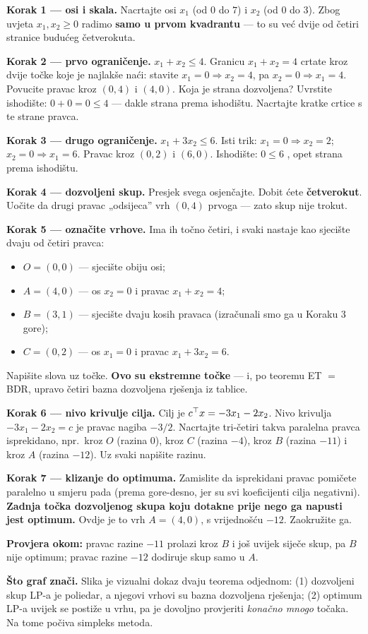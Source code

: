 \begin{crtanje}
\textbf{Korak 1 --- osi i skala.} Nacrtajte osi $x_1$ (od $0$ do $7$) i $x_2$
(od $0$ do $3$). Zbog uvjeta $x_1, x_2 \ge 0$ radimo \textbf{samo u prvom
kvadrantu} --- to su već dvije od četiri stranice budućeg četverokuta.

\textbf{Korak 2 --- prvo ograničenje.} $x_1 + x_2 \le 4$. Granicu $x_1+x_2=4$
crtate kroz dvije točke koje je najlakše naći: stavite $x_1=0 \Rightarrow
x_2=4$, pa $x_2=0 \Rightarrow x_1=4$. Povucite pravac kroz $(0,4)$ i $(4,0)$.
Koja je strana dozvoljena? Uvrstite ishodište: $0+0=0 \le 4$ \checkmark --- dakle
strana prema ishodištu. Nacrtajte kratke crtice s te strane pravca.

\textbf{Korak 3 --- drugo ograničenje.} $x_1 + 3x_2 \le 6$. Isti trik:
$x_1=0 \Rightarrow x_2=2$; $x_2=0 \Rightarrow x_1=6$. Pravac kroz $(0,2)$ i
$(6,0)$. Ishodište: $0 \le 6$ \checkmark, opet strana prema ishodištu.

\textbf{Korak 4 --- dozvoljeni skup.} Presjek svega osjenčajte. Dobit ćete
\textbf{četverokut}. Uočite da drugi pravac „odsijeca” vrh $(0,4)$ prvoga ---
zato skup nije trokut.

\textbf{Korak 5 --- označite vrhove.} Ima ih točno četiri, i svaki nastaje kao
sjecište dvaju od četiri pravca:
\begin{itemize}
  \item $O = (0,0)$ --- sjecište obiju osi;
  \item $A = (4,0)$ --- os $x_2 = 0$ i pravac $x_1+x_2=4$;
  \item $B = (3,1)$ --- sjecište dvaju kosih pravaca (izračunali smo ga
        u Koraku 3 gore);
  \item $C = (0,2)$ --- os $x_1 = 0$ i pravac $x_1+3x_2=6$.
\end{itemize}
Napišite slova uz točke. \textbf{Ovo su ekstremne točke} --- i, po teoremu
ET $=$ BDR, upravo četiri bazna dozvoljena rješenja iz tablice.

\textbf{Korak 6 --- nivo krivulje cilja.} Cilj je $c^{\top} x = -3x_1 - 2x_2$. Nivo
krivulja $-3x_1-2x_2 = c$ je pravac nagiba $-3/2$. Nacrtajte tri-četiri takva
paralelna pravca isprekidano, npr.\ kroz $O$ (razina $0$), kroz $C$ (razina
$-4$), kroz $B$ (razina $-11$) i kroz $A$ (razina $-12$). Uz svaki napišite
razinu.

\textbf{Korak 7 --- klizanje do optimuma.} Zamislite da isprekidani pravac
pomičete paralelno u smjeru pada (prema gore-desno, jer su svi koeficijenti
cilja negativni). \textbf{Zadnja točka dozvoljenog skupa koju dotakne prije nego
ga napusti jest optimum.} Ovdje je to vrh $A = (4,0)$, s vrijednošću $-12$.
Zaokružite ga.

\textbf{Provjera okom:} pravac razine $-11$ prolazi kroz $B$ i još uvijek siječe
skup, pa $B$ nije optimum; pravac razine $-12$ dodiruje skup samo u $A$.
\checkmark

\textbf{Što graf znači.} Slika je vizualni dokaz dvaju teorema odjednom:
(1) dozvoljeni skup LP-a je poliedar, a njegovi vrhovi su bazna dozvoljena
rješenja; (2) optimum LP-a uvijek se postiže u vrhu, pa je dovoljno provjeriti
\emph{konačno mnogo} točaka. Na tome počiva simpleks metoda.
\end{crtanje}

